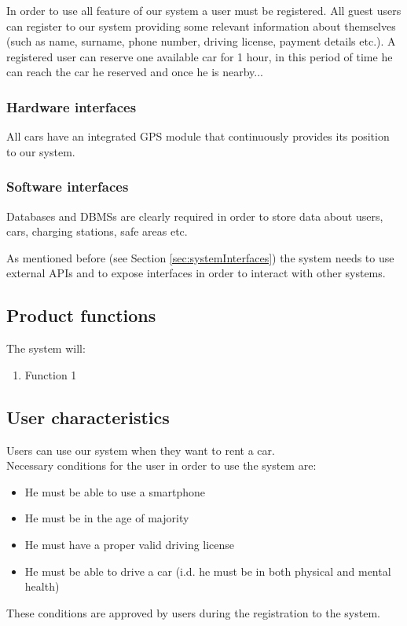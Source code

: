 	In order to use all feature of our system a user must be registered. All guest users can register to our system providing some relevant information about themselves (such as name, surname, phone number, driving license, payment details etc.). A registered user can reserve one available car for 1 hour, in this period of time he can reach the car he reserved and once he is nearby...

\subsubsection{Hardware interfaces}
	All cars have an integrated GPS module that continuously provides its position to our system.

\subsubsection{Software interfaces}
	Databases and DBMSs are clearly required in order to store data about users, cars, charging stations, safe areas etc.
	
	As mentioned before (see Section \ref{sec:systemInterfaces}) the system needs to use external APIs and to expose interfaces in order to interact with other systems.
	
\subsection{Product functions}
	The system will:
	\begin{enumerate}[label=\textbf{F\arabic*.}]
		\item Function 1
	\end{enumerate}

\subsection{User characteristics}
	Users can use our system when they want to rent a car.\\
	Necessary conditions for the user in order to use the system are:
	\begin{itemize}
		\item He must be able to use a smartphone
		\item He must be in the age of majority
		\item He must have a proper valid driving license
		\item He must be able to drive a car (i.d. he must be in both physical and mental health)
	\end{itemize}
	These conditions are approved by users during the registration to the system.

